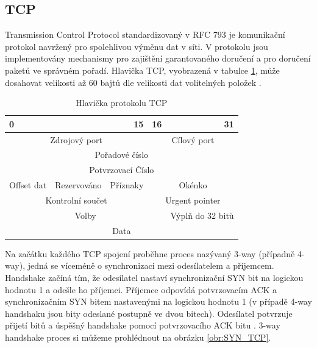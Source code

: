 \subsection{TCP}
\par Transmission Control Protocol standardizovaný v RFC 793 je komunikační protokol navržený pro spolehlivou výměnu dat v síti. V protokolu jsou implementovány mechanismy pro zajištění garantovaného doručení a pro doručení paketů ve správném pořadí. Hlavička TCP, vyobrazená v tabulce \ref{table:TCPheader}, může dosahovat velikosti až 60 bajtů dle velikosti dat volitelných položek \cite{Foxc2022}.
    \begin{table}[!h]
    \caption[TCP hlavička]{Hlavička protokolu TCP}
    \label{table:TCPheader}
    \begin{center}
    \begin{tabular}{|cccclr|}
    \hline
    \multicolumn{1}{|l}{0} & \multicolumn{1}{r}{} & \multicolumn{1}{r|}{15} & \multicolumn{1}{r}{16} &  & 31 \\
    \hline
    \multicolumn{3}{|c|}{Zdrojový port} & \multicolumn{3}{c|}{Cílový port} \\
    \hline
    \multicolumn{6}{|c|}{Pořadové číslo} \\
    \hline
    \multicolumn{6}{|c|}{Potvrzovací Číslo} \\
    \hline
    \multicolumn{1}{|c|}{Offset dat} & \multicolumn{1}{c|}{Rezervováno} & \multicolumn{1}{c|}{Příznaky} & \multicolumn{3}{c|}{Okénko} \\
    \hline
    \multicolumn{3}{|c|}{Kontrolní součet} & \multicolumn{3}{c|}{Urgent pointer} \\
    \hline
    \multicolumn{4}{|c|}{Volby} & \multicolumn{2}{c|}{Výplň do 32 bitů} \\
    \hline
    \multicolumn{6}{|c|}{Data} \\
    \hline
    \end{tabular}
    \end{center}
    \end{table}
\par Na začátku každého TCP spojení proběhne proces nazývaný 3-way (případně 4-way), jedná se víceméně o synchronizaci mezi odesílatelem a příjemcem. Handshake začíná tím, že odesílatel nastaví synchronizační SYN bit na logickou hodnotu 1 a odešle ho příjemci. Příjemce odpovídá potvrzovacím ACK a synchronizačním SYN bitem nastavenými na logickou hodnotu 1 (v případě 4-way handshaku jsou bity odeslané postupně ve dvou bitech). Odesílatel potvrzuje přijetí bitů a úspěšný handshake pomocí potvrzovacího ACK bitu \cite{Foxc2022}. 3-way handshake proces si můžeme prohlédnout na obrázku \ref{obr:SYN_TCP}.

